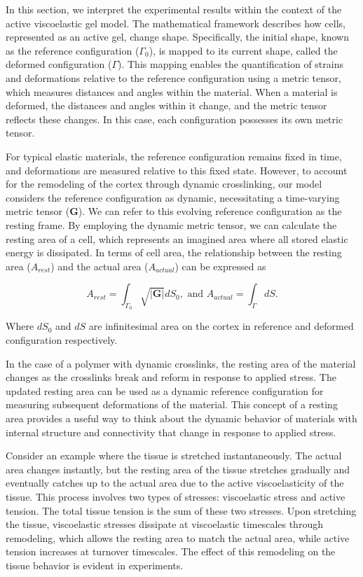 	
	
In this section, we interpret the experimental results within the
context of the active viscoelastic gel model. The mathematical framework
describes how cells, represented as an active gel, change shape.
Specifically, the initial shape, known as the reference configuration
(\(\Gamma_{0}\)), is mapped to its current shape, called the deformed
configuration (\(\Gamma\)). This mapping enables the quantification of
strains and deformations relative to the reference configuration using a
metric tensor, which measures distances and angles within the material.
When a material is deformed, the distances and angles within it change,
and the metric tensor reflects these changes. In this case, each
configuration possesses its own metric tensor.

For typical elastic materials, the reference configuration remains fixed
in time, and deformations are measured relative to this fixed state.
However, to account for the remodeling of the cortex through dynamic
crosslinking, our model considers the reference configuration as
dynamic, necessitating a time-varying metric tensor (\(\mathbf{G}\)). We
can refer to this evolving reference configuration as the resting frame.
By employing the dynamic metric tensor, we can calculate the resting
area of a cell, which represents an imagined area where all stored
elastic energy is dissipated. In terms of cell area, the relationship
between the resting area (\(A_{rest}\)) and the actual area
(\(A_{actual}\)) can be expressed as

\begin{equation}
	A_{rest} = \int_{\Gamma_0} \sqrt{|\mathbf{G}|}dS_0, \text{ and } A_{actual} = \int_{\Gamma}dS.
\end{equation}

Where $dS_{0}$ and $dS$ are infinitesimal area on the cortex in
reference and deformed configuration respectively.


In the case of a polymer with dynamic crosslinks, the resting area of
the material changes as the crosslinks break and reform in response to
applied stress. The updated resting area can be used as a dynamic
reference configuration for measuring subsequent deformations of the
material. This concept of a resting area provides a useful way to think
about the dynamic behavior of materials with internal structure and
connectivity that change in response to applied stress.

Consider an example where the tissue is stretched instantaneously. The
actual area changes instantly, but the resting area of the tissue
stretches gradually and eventually catches up to the actual area due to
the active viscoelasticity of the tissue. This process involves two
types of stresses: viscoelastic stress and active tension. The total
tissue tension is the sum of these two stresses. Upon stretching the
tissue, viscoelastic stresses dissipate at viscoelastic timescales
through remodeling, which allows the resting area to match the actual
area, while active tension increases at turnover timescales. The effect
of this remodeling on the tissue behavior is evident in experiments.

